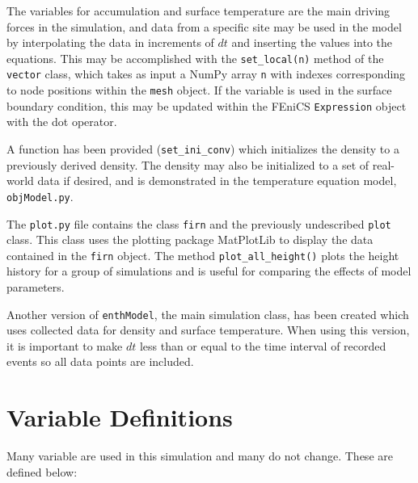 \documentclass{article}%
\begin{document}
The variables for accumulation and surface temperature are the main driving forces in the simulation, and data from a specific site may be used in the model by interpolating the data in increments of $dt$ and inserting the values into the equations.  This may be accomplished with the \texttt{set\_local(n)} method of the \texttt{vector} class, which takes as input a NumPy array \texttt{n} with indexes corresponding to node positions within the \texttt{mesh} object.  If the variable is used in the surface boundary condition, this may be updated within the FEniCS \texttt{Expression} object with the dot operator.

A function has been provided (\texttt{set\_ini\_conv}) which initializes the density to a previously derived density.  The density may also be initialized to a set of real-world data if desired, and is demonstrated in the temperature equation model, \texttt{objModel.py}.

The \texttt{plot.py} file contains the class \texttt{firn} and the previously undescribed \texttt{plot} class.  This class uses the plotting package MatPlotLib to display the data contained in the \texttt{firn} object.  The method \texttt{plot\_all\_height()} plots the height history for a group of simulations and is useful for comparing the effects of model parameters. 

Another version of \texttt{enthModel}, the main simulation class, has been created which uses collected data for density and surface temperature.  When using this version, it is important to make $dt$ less than or equal to the time interval of recorded events so all data points are included. 


\section{Variable Definitions}

Many variable are used in this simulation and many do not change.  These are defined below:\\
\end{document}
